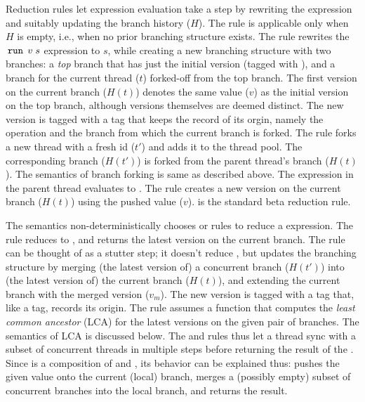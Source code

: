 Reduction rules let expression evaluation take a step by rewriting the
expression and suitably updating the branch history ($H$). The
 rule is applicable only when $H$ is empty, i.e.,
when no prior branching structure exists. The rule rewrites the
$\,{\tt run}\,\;v\;s$ expression to $s$, while creating a new branching
structure with two branches: a \emph{top} branch that has just the
initial version (tagged with ), and a branch for the current
thread ($t$) forked-off from the top branch.  The first version on the
current branch ($H(t)$) denotes the same value ($v$) as the initial
version on the top branch, although versions themselves are deemed
distinct. The new version is tagged with a  tag that keeps the
record of its orgin, namely the  operation and the branch from
which the current branch is forked. The  rule forks
a new thread with a fresh id ($t'$) and adds it to the thread pool.
The corresponding branch ($H(t')$) is forked from the parent thread's
branch ($H(t)$). The semantics of branch forking is same as described
above. The  expression in the parent thread evaluates to
\C{()}. The  rule creates a new version on the
current branch ($H(t)$) using the pushed value ($v$).
 is the standard beta reduction rule.

The semantics non-deterministically chooses  or
 rules to reduce a  expression. The
 rule reduces  to \C{()}, and returns the
latest version on the current branch. The  rule
can be thought of as a stutter step; it doesn't reduce , but
updates the branching structure by merging (the latest version of) a
concurrent branch ($H(t')$) into (the latest version of) the current
branch ($H(t)$), and extending the current branch with the merged
version ($v_m$). The new version is tagged with a  tag that,
like a  tag, records its origin. The rule assumes a function
 that computes the \emph{least common ancestor} (LCA) for the
latest versions on the given pair of branches. The semantics of LCA is
discussed below. The  and 
rules thus let a thread sync with a subset of concurrent threads in
multiple steps before returning the result of the . Since
 is a composition of  and , its behavior can
be explained thus:  pushes the given value onto the current
(local) branch, merges a (possibly empty) subset of concurrent
branches into the local branch, and returns the result.




